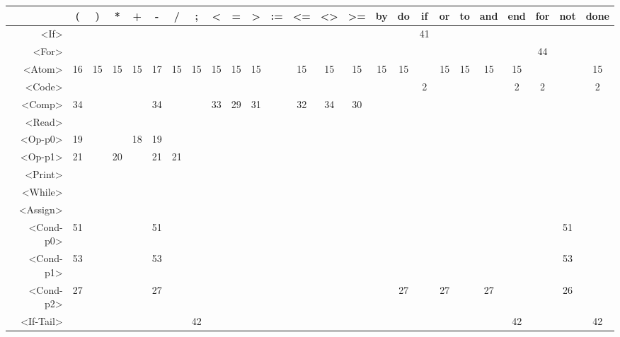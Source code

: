 \begin{tabular}{r|c@{ }c@{ }c@{ }c@{ }c@{ }c@{ }c@{ }c@{ }c@{ }c@{ }c@{ }c@{ }c@{ }c@{ }c@{ }c@{ }c@{ }c@{ }c@{ }c@{ }c@{ }c@{ }c@{ }c@{ }}
 & ( & ) & * & + & - & / & ; & < & = & > & := & <= & <> & >= & by & do & if & or & to & and & end & for & not & done \\\hline
<If> &   &   &   &   &   &   &   &   &   &   &   &   &   &   &   &   & 41 &   &   &   &   &   &   &   \\\hline
<For> &   &   &   &   &   &   &   &   &   &   &   &   &   &   &   &   &   &   &   &   &   & 44 &   &   \\\hline
<Atom> & 16 & 15 & 15 & 15 & 17 & 15 & 15 & 15 & 15 & 15 &   & 15 & 15 & 15 & 15 & 15 &   & 15 & 15 & 15 & 15 &   &   & 15 \\\hline
<Code> &   &   &   &   &   &   &   &   &   &   &   &   &   &   &   &   & 2 &   &   &   & 2 & 2 &   & 2 \\\hline
<Comp> & 34 &   &   &   & 34 &   &   & 33 & 29 & 31 &   & 32 & 34 & 30 &   &   &   &   &   &   &   &   &   &   \\\hline
<Read> &   &   &   &   &   &   &   &   &   &   &   &   &   &   &   &   &   &   &   &   &   &   &   &   \\\hline
<Op-p0> & 19 &   &   & 18 & 19 &   &   &   &   &   &   &   &   &   &   &   &   &   &   &   &   &   &   &   \\\hline
<Op-p1> & 21 &   & 20 &   & 21 & 21 &   &   &   &   &   &   &   &   &   &   &   &   &   &   &   &   &   &   \\\hline
<Print> &   &   &   &   &   &   &   &   &   &   &   &   &   &   &   &   &   &   &   &   &   &   &   &   \\\hline
<While> &   &   &   &   &   &   &   &   &   &   &   &   &   &   &   &   &   &   &   &   &   &   &   &   \\\hline
<Assign> &   &   &   &   &   &   &   &   &   &   &   &   &   &   &   &   &   &   &   &   &   &   &   &   \\\hline
<Cond-p0> & 51 &   &   &   & 51 &   &   &   &   &   &   &   &   &   &   &   &   &   &   &   &   &   & 51 &   \\\hline
<Cond-p1> & 53 &   &   &   & 53 &   &   &   &   &   &   &   &   &   &   &   &   &   &   &   &   &   & 53 &   \\\hline
<Cond-p2> & 27 &   &   &   & 27 &   &   &   &   &   &   &   &   &   &   & 27 &   & 27 &   & 27 &   &   & 26 &   \\\hline
<If-Tail> &   &   &   &   &   &   & 42 &   &   &   &   &   &   &   &   &   &   &   &   &   & 42 &   &   & 42 \\\hline

\end{tabular}
